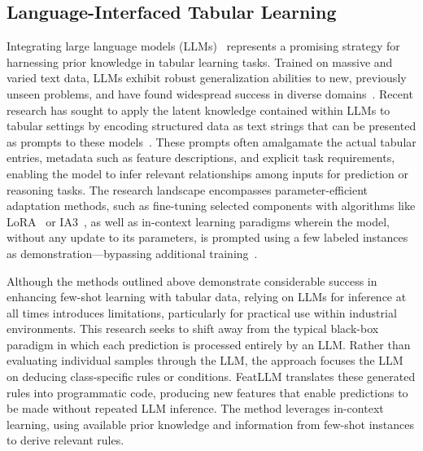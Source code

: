 \subsection{Language-Interfaced Tabular Learning}

Integrating large language models (LLMs)~\cite{anil2023palm,openai2023gpt4} represents a promising strategy for harnessing prior knowledge in tabular learning tasks. Trained on massive and varied text data, LLMs exhibit robust generalization abilities to new, previously unseen problems, and have found widespread success in diverse domains~\cite{brown2020language}. Recent research has sought to apply the latent knowledge contained within LLMs to tabular settings by encoding structured data as text strings that can be presented as prompts to these models~\cite{dinh2022lift,hegselmann2023tabllm,wang2023anypredict}. These prompts often amalgamate the actual tabular entries, metadata such as feature descriptions, and explicit task requirements, enabling the model to infer relevant relationships among inputs for prediction or reasoning tasks. The research landscape encompasses parameter-efficient adaptation methods, such as fine-tuning selected components with algorithms like LoRA~\cite{hu2021lora} or IA3~\cite{liu2022few}, as well as in-context learning paradigms wherein the model, without any update to its parameters, is prompted using a few labeled instances as demonstration—bypassing additional training~\cite{dinh2022lift,hegselmann2023tabllm,nam2023semi,slack2023tablet}.

Although the methods outlined above demonstrate considerable success in enhancing few-shot learning with tabular data, relying on LLMs for inference at all times introduces limitations, particularly for practical use within industrial environments. This research seeks to shift away from the typical black-box paradigm in which each prediction is processed entirely by an LLM. Rather than evaluating individual samples through the LLM, the approach focuses the LLM on deducing class-specific rules or conditions. \textsf{FeatLLM} translates these generated rules into programmatic code, producing new features that enable predictions to be made without repeated LLM inference. The method leverages in-context learning, using available prior knowledge and information from few-shot instances to derive relevant rules.

